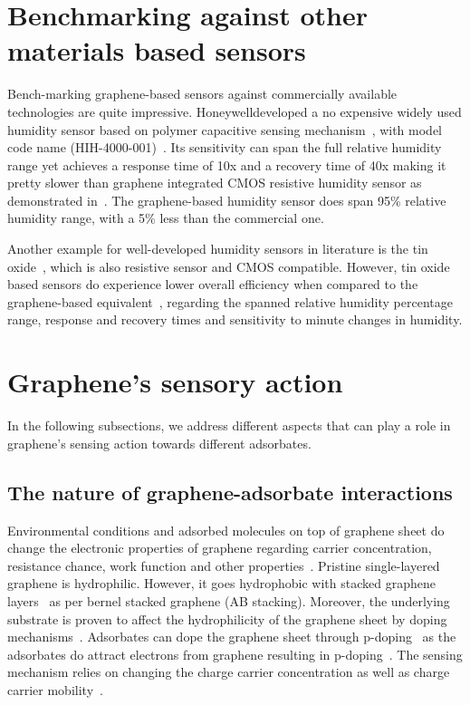 \section{Benchmarking against other materials based sensors}
Bench-marking graphene-based sensors against commercially available technologies are quite impressive. Honeywell\texttrademark developed a no expensive widely used humidity sensor based on polymer capacitive sensing mechanism~\cite{Delapierre1983}, with model code name (HIH-4000-001)~\cite{honeywell}. Its sensitivity can span the full relative humidity range yet achieves a response time of 10x and a recovery time of 40x making it pretty slower than graphene integrated CMOS resistive humidity sensor as demonstrated in~\cite{Smith2015}. The graphene-based humidity sensor does span 95\% relative humidity range, with a 5\% less than the commercial one.

Another example for well-developed humidity sensors in literature is the tin oxide~\cite{Kuang2007}, which is also resistive sensor and CMOS compatible. However, tin oxide based sensors do experience lower overall efficiency when compared to the graphene-based equivalent~\cite{Smith2015}, regarding the spanned relative humidity percentage range, response and recovery times and sensitivity to minute changes in humidity.
%
%
\section{Graphene's sensory action}
In the following subsections, we address different aspects that can play a role in graphene's sensing action towards different adsorbates.
%
%
\subsection{The nature of graphene-adsorbate interactions}
Environmental conditions and adsorbed molecules on top of graphene sheet do change the electronic properties of graphene regarding carrier concentration, resistance chance, work function and other properties~\cite{Kozbial2014, Panchal2016}. Pristine single-layered graphene is hydrophilic. However, it goes hydrophobic with stacked graphene layers~\cite{Munz2015} as per bernel stacked graphene (AB stacking). Moreover, the underlying substrate is proven to affect the hydrophilicity of the graphene sheet by doping mechanisms~\cite{Hong2016}. Adsorbates can dope the graphene sheet through p-doping~\cite{Panchal2016} as the adsorbates do attract electrons from graphene resulting in p-doping~\cite{Bollmann2015}. The sensing mechanism relies on changing the charge carrier concentration as well as charge carrier mobility~\cite{Melios2016, Melios2017tuning}.
%
%
